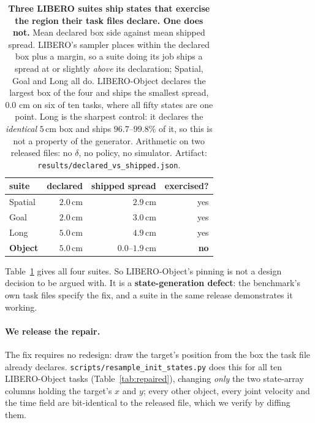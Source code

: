 \documentclass[10pt,twocolumn]{article}
\begin{document}
\begin{table}[h]\centering\footnotesize
\setlength{\tabcolsep}{4pt}
\begin{tabular}{lrrr}
\toprule
suite & declared & shipped spread & exercised? \\
\midrule
Spatial & $2.0$\,cm & $2.9$\,cm & yes \\
Goal & $2.0$\,cm & $3.0$\,cm & yes \\
Long & $5.0$\,cm & $4.9$\,cm & yes \\
\textbf{Object} & $\mathbf{5.0}$\,cm & $\mathbf{0.0}$--$\mathbf{1.9}$\,cm & \textbf{no} \\
\bottomrule
\end{tabular}
\caption{\textbf{Three LIBERO suites ship states that exercise the region their
task files declare. One does not.} Mean declared box side against mean shipped
spread. LIBERO's sampler places within the declared box plus a margin, so a
suite doing its job ships a spread at or slightly \emph{above} its
declaration; Spatial, Goal and Long all do. LIBERO-Object declares the largest box of
the four and ships the smallest spread, $0.0$ cm on six of ten tasks, where all
fifty states are one point. Long is the sharpest control: it declares the
\emph{identical} $5$\,cm box and ships $96.7$--$99.8\%$ of it, so this is not a
property of the generator. Arithmetic on two released files: no $\delta$, no
policy, no simulator. Artifact:
\texttt{results/declared\_vs\_shipped.json}.}
\label{tab:declared}
\end{table}

Table~\ref{tab:declared} gives all four suites. So LIBERO-Object's pinning is
not a design decision to be argued with. It is a \textbf{state-generation
defect}: the benchmark's own task files specify the
fix, and a suite in the same release demonstrates it working.

\paragraph{We release the repair.} The fix requires no
redesign: draw the target's position from the box the task file already
declares. \texttt{scripts/resample\_init\_states.py} does this for all ten
LIBERO-Object tasks (Table~\ref{tab:repaired}), changing \emph{only} the two
state-array columns holding the target's $x$ and $y$; every other object, every joint velocity and the
time field are bit-identical to the released file, which we verify by diffing
them.
\end{document}
